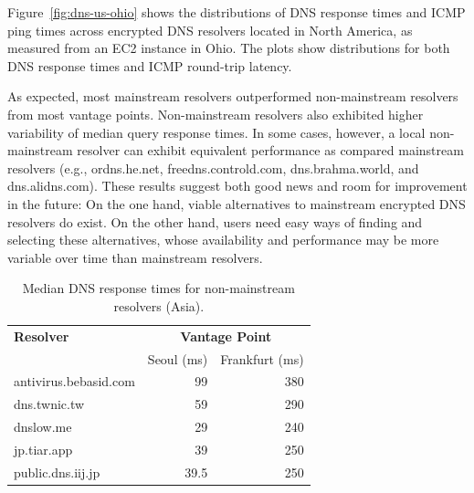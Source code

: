 Figure~\ref{fig:dns-us-ohio} shows the distributions of DNS response times and
ICMP ping times across encrypted DNS resolvers located in North America, as
measured from an EC2 instance in Ohio. The plots show distributions for both DNS response times and ICMP round-trip latency.

As expected, most mainstream resolvers outperformed non-mainstream resolvers from most vantage points. Non-mainstream resolvers also exhibited higher variability of median query response times. In some cases, however, a local non-mainstream resolver can exhibit equivalent performance as compared mainstream resolvers (e.g., ordns.he.net, freedns.controld.com, dns.brahma.world, and dns.alidns.com). These results suggest both good news and room for improvement in the future: On the one hand, viable alternatives to mainstream encrypted DNS resolvers do exist. On the other hand, users need easy ways of finding and selecting these alternatives, whose availability and performance may be more variable over time than mainstream resolvers.

\begin{table}[t!]
\centering
\begin{tabular}{l|rr}
\toprule
    \textbf{Resolver} & \multicolumn{2}{c}{\textbf{Vantage Point}} \\
                  & \textrm{Seoul (ms)}         & \textrm{Frankfurt (ms)} \\
\midrule
antivirus.bebasid.com                                & 99 & 380                            \\
dns.twnic.tw                          & 59                                          & 290                              \\
dnslow.me                                & 29                                           & 240                              \\
jp.tiar.app                            & 39                                           & 250                             \\
public.dns.iij.jp                              & 39.5                                           & 250                               \\
\bottomrule
\end{tabular}
    \caption{Median DNS response times for non-mainstream resolvers (Asia).}
\label{tab:UnconvAsia}
\end{table}

